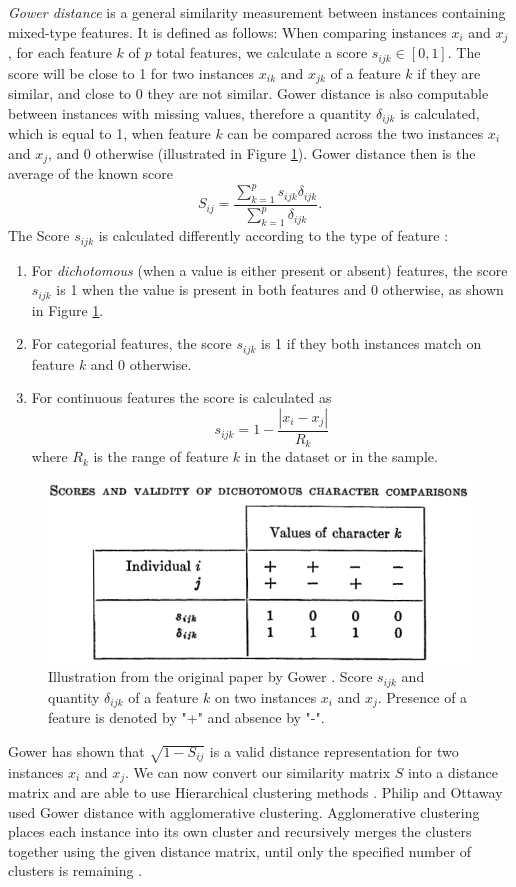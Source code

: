 \textit{Gower distance} \cite{gower} is a general similarity measurement between instances containing mixed-type features. It is defined as follows: When comparing instances $x_i$ and $x_j$, for each feature $k$ of $p$ total features, we calculate a score $s_{ijk} \in [0,1]$. The score will be close to 1 for two instances $x_{ik}$ and $x_{jk}$ of a feature $k$ if they are similar, and close to 0 they are not similar.
Gower distance is also computable between instances with missing values, therefore a quantity $\delta_{ijk}$ is calculated, which is equal to 1, when feature $k$ can be compared across the two instances $x_i$ and $x_j$, and 0 otherwise (illustrated in Figure \ref{gower_dichotomous}).
Gower distance then is the average of the known score
$$S_{ij} = \frac{\sum^p_{k=1}s_{ijk}\delta_{ijk}}{\sum^p_{k=1}\delta_{ijk}}.$$
The Score $s_{ijk}$ is calculated differently according to the type of feature \cite{gower}:
\begin{enumerate}
	\item For \textit{dichotomous} (when a value is either present or absent) features, the score $s_{ijk}$ is 1 when the value is present in both features and 0 otherwise, as shown in Figure \ref{gower_dichotomous}.
	\item For categorial features, the score $s_{ijk}$ is 1 if they both instances match on feature $k$ and 0 otherwise.
	\item For continuous features the score is calculated as
	$$s_{ijk} = 1-\frac{|x_i-x_j|}{R_k}$$
	where $R_k$ is the range of feature $k$ in the dataset or in the sample.
\end{enumerate}
\begin{figure}
	\includegraphics[width=\linewidth]{gower-dichotomous.png}
	\caption{Illustration from the original paper by Gower \cite{gower}. Score $s_{ijk}$ and quantity $\delta_{ijk}$ of a feature $k$ on two instances $x_i$ and $x_j$. Presence of a feature is denoted by "+" and absence by "-".}
	\label{gower_dichotomous}
\end{figure}
Gower \cite{gower} has shown that $\sqrt{1- S_{ij}}$ is a valid distance representation for two instances $x_i$ and $x_j$. We can now convert our similarity matrix $S$ into a distance matrix and are able to use Hierarchical clustering methods \cite{algorithms_for_clustering_data}. Philip and Ottaway \cite{philip_ottaway} used Gower distance with agglomerative clustering. Agglomerative clustering places each instance into its own cluster and recursively merges the clusters together using the given distance matrix, until only the specified number of clusters is remaining \cite{algorithms_for_clustering_data}.

